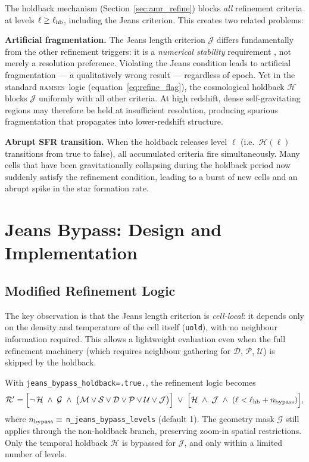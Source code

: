 \documentclass[fleqn,usenatbib]{mnras}
\newcommand{\ramses}{\textsc{ramses}}
\newcommand{\code}[1]{\texttt{#1}}
\begin{document}
The holdback mechanism (Section~\ref{sec:amr_refine}) blocks
\emph{all} refinement criteria at levels $\ell \ge \ell_{\rm hb}$,
including the Jeans criterion.  This creates two related problems:

\textbf{Artificial fragmentation.}
The Jeans length criterion $\mathcal{J}$ differs fundamentally from
the other refinement triggers: it is a \emph{numerical stability}
requirement \citep{Truelove1997}, not merely a resolution preference.
Violating the Jeans condition leads to artificial fragmentation ---
a qualitatively wrong result --- regardless of epoch.  Yet in the
standard \ramses\ logic (equation~\ref{eq:refine_flag}), the
cosmological holdback $\mathcal{H}$ blocks $\mathcal{J}$ uniformly
with all other criteria.  At high redshift, dense self-gravitating
regions may therefore be held at insufficient resolution, producing
spurious fragmentation that propagates into lower-redshift structure.

\textbf{Abrupt SFR transition.}
When the holdback releases level $\ell$ (i.e.\ $\mathcal{H}(\ell)$
transitions from true to false), all accumulated criteria fire
simultaneously.  Many cells that have been gravitationally collapsing
during the holdback period now suddenly satisfy the refinement
condition, leading to a burst of new cells and an abrupt spike in
the star formation rate.


\section{Jeans Bypass: Design and Implementation}
\label{sec:bypass}

\subsection{Modified Refinement Logic}

The key observation is that the Jeans length criterion is
\emph{cell-local}: it depends only on the density and temperature of the
cell itself (\code{uold}), with no neighbour information required.  This
allows a lightweight evaluation even when the full refinement machinery
(which requires neighbour gathering for $\mathcal{D}$, $\mathcal{P}$,
$\mathcal{U}$) is skipped by the holdback.

With \code{jeans\_bypass\_holdback=.true.}, the refinement logic becomes
\begin{equation}
\mathcal{R}' = \Bigl[
  \lnot\,\mathcal{H} \;\land\; \mathcal{G} \;\land\;
  \bigl(\mathcal{M} \lor \mathcal{S} \lor \mathcal{D}
        \lor \mathcal{P} \lor \mathcal{U} \lor \mathcal{J}\bigr)
\Bigr]
\;\lor\;
\Bigl[ \mathcal{H} \;\land\; \mathcal{J} \;\land\;
  (\ell < \ell_{\rm hb} + n_{\rm bypass}) \Bigr],
\label{eq:refine_bypass}
\end{equation}
where $n_{\rm bypass} \equiv$ \code{n\_jeans\_bypass\_levels}
(default 1).  The geometry mask $\mathcal{G}$ still applies through the
non-holdback branch, preserving zoom-in spatial restrictions.  Only the
temporal holdback $\mathcal{H}$ is bypassed for $\mathcal{J}$, and only
within a limited number of levels.
\end{document}
